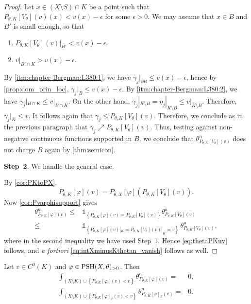 \begin{proof}
Let $x\in (X\setminus S) \cap K$ be a point such that $P_{\theta,K}[V_{\theta}](v)(x)<v(x)-\epsilon$ for some $\epsilon>0$. We may assume that $x\in B$ and $B'$ is small enough, so that
\begin{enumerate}
    \item\label{itm:chapter-Bergman:L380:1} $P_{\theta,K}[V_{\theta}](v)|_{\overline {B'}}<v(x)-\epsilon$.
    \item\label{itm:chapter-Bergman:L380:2} $v|_{\overline {B'}\cap K}>v(x)-\epsilon$.
\end{enumerate}
By \ref{itm:chapter-Bergman:L380:1}, we have $\gamma_j|_{\partial B}\leq v(x)-\epsilon$, hence by \cref{prop:dom_prin_loc}, $\gamma_j|_B\leq v(x)-\epsilon$. By \ref{itm:chapter-Bergman:L380:2}, we have $\gamma_j|_{B\cap K}\leq v|_{B\cap K}$. On the other hand, $\gamma_j|_{K\setminus B}=\eta_{j}|_{K\setminus B}\leq v|_{K\setminus B}$. Therefore, $\gamma_j|_K\leq v$. It follows again that $\gamma_j\leq P_{\theta,K}[V_{\theta}](v)$. Therefore, we conclude as in the previous paragraph that $\gamma_j\nearrow P_{\theta,K}[V_{\theta}](v)$. Thus, testing against non-negative continuous functions supported in $B$, we conclude that $\theta^n_{P_{\theta,K}[V_{\theta}](v)}$ does not charge $B$ again by \cref{thm:semicon}.

\textbf{Step~2}. We handle the general case.

By \cref{cor:PKtoPX},
\[
P_{\theta,K}[\varphi](v) = P_{\theta,X}[\varphi]\left(P_{\theta,K}[V_{\theta}](v)\right).
\]
Now \cref{cor:Pvarphisupport} gives
\[
\begin{aligned}
\theta_{P_{\theta,K}[\varphi](v)}^n \leq & \mathds{1}_{\left\{P_{\theta,K}[\varphi](v) = P_{\theta,K}[V_{\theta}](v)\right\}} \theta_{P_{\theta,K}[V_{\theta}](v)}^n \\
\leq & \mathds{1}_{\left\{P_{\theta,K}[\varphi](v)|_K=P_{\theta,K}[V_{\theta}](v)|_K=v\right\}}\,\theta_{P_{\theta,K}[V_{\theta}](v)}^n,
\end{aligned}
\]
where in the second inequality we have used Step~1. Hence \eqref{eq:thetaPKuv} follows, and \emph{a fortiori} \eqref{eq:intXminusKthetan_vanish} follows as well.
\end{proof}

\begin{corollary}\label{cor:suppthetan}
Let $v\in C^0(K)$ and $\varphi\in \mathrm{PSH}(X,\theta)_{>0}$. Then
\begin{equation}\label{eq:thetandoesnotcharge1}
\begin{aligned}
\int_{(X\setminus K)\cup \left\{P_{\theta,K}[\varphi](v)<v\right\}}\theta^n_{P_{\theta,K}[\varphi](v)}=& 0,\\
\int_{(X\setminus K)\cup \left\{P_{\theta,K}[\varphi]_{\mathcal{I}}(v)<v\right\}}\theta^n_{P_{\theta,K}[\varphi]_{\mathcal{I}}(v)}=& 0.
\end{aligned}
\end{equation}
\end{corollary}

